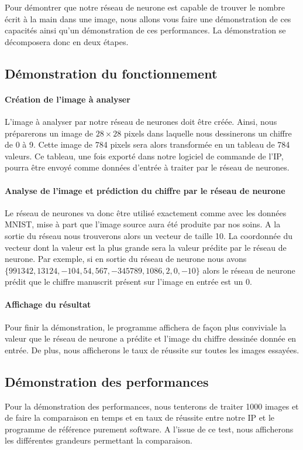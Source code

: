 Pour démontrer que notre réseau de neurone est capable de trouver le nombre écrit à la main 
dans une image, nous allons vous faire une démonstration de ces capacités ainsi qu'un démonstration de ces performances. 
La démonstration se décomposera donc en deux étapes.

\subsection{Démonstration du fonctionnement}

\paragraph{Création de l'image à analyser\\}
	L'image à analyser par notre réseau de neurones doit être créée. Ainsi, nous préparerons 
	un image de $28 \times 28$ pixels dans laquelle nous dessinerons un chiffre de 0 à 9. 
	Cette image de 784 pixels sera alors transformée en un tableau de 784 valeurs. 
	Ce tableau, une fois exporté dans notre logiciel de commande de l'IP, 
	pourra être envoyé comme données d'entrée à traiter par le réseau de neurones.
	
\paragraph{Analyse de l'image et prédiction du chiffre par le réseau de neurone\\}
	Le réseau de neurones va donc être utilisé exactement comme avec les données MNIST\cite{lecun2010mnist}, 
	mise à part que l'image source aura été produite par nos soins. A la sortie du réseau 
	nous trouverons alors un vecteur de taille 10. La coordonnée du vecteur dont la 
	valeur est la plus grande sera la valeur prédite par le réseau de neurone. 
	Par exemple, si en sortie du réseau de neurone nous avons $\{991342, 13124, -104, 54, 567, -345789, 1086, 2, 0, -10\}$ 
	alors le réseau de neurone prédit que le chiffre manuscrit présent sur l'image en entrée est un 0.
	
\paragraph{Affichage du résultat\\}
	Pour finir la démonstration, le programme affichera de façon plus conviviale 
	la valeur que le réseau de neurone a prédite et l'image du chiffre dessinée donnée en entrée. 
	De plus, nous afficherons le taux de réussite sur toutes les images essayées.
	
\subsection{Démonstration des performances}
	Pour la démonstration des performances, nous tenterons de traiter 1000 images 
	et de faire la comparaison en temps et en taux de réussite entre notre IP 
	et le programme de référence purement software. A l'issue de ce test, nous afficherons les 
	différentes grandeurs permettant la comparaison.

